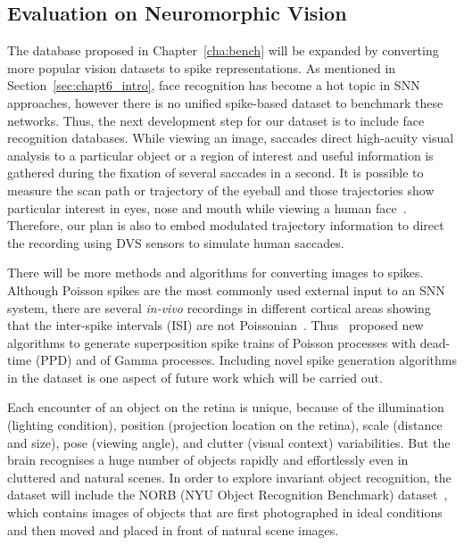 \subsection{Evaluation on Neuromorphic Vision}
The database proposed in Chapter~\ref{cha:bench} will be expanded by converting more popular vision datasets to spike representations.
As mentioned in Section~\ref{sec:chapt6_intro}, face recognition has become a hot topic in SNN approaches, however there is no unified spike-based dataset to benchmark these networks.
Thus, the next development step for our dataset is to include face recognition databases.
While viewing an image, saccades direct high-acuity visual analysis to a particular object or a region of interest and useful information is gathered during the fixation of several saccades in a second.
It is possible to measure the scan path or trajectory of the eyeball and those trajectories show particular interest in eyes, nose and mouth while viewing a human face~\cite{yarbus1967eye}.
Therefore, our plan is also to embed modulated trajectory information to direct the recording using DVS sensors to simulate human saccades.

There will be more methods and algorithms for converting images to spikes.
Although Poisson spikes are the most commonly used external input to an SNN system, there are several \textit{in-vivo} recordings in different cortical areas showing that the inter-spike intervals (ISI) are not Poissonian~\cite{deger2012statistical}. 
Thus~\cite{deger2012statistical} proposed new algorithms to generate superposition spike trains of Poisson processes with dead-time (PPD) and of Gamma processes.
Including novel spike generation algorithms in the dataset is one aspect of future work which will be carried out.

Each encounter of an object on the retina is unique, because of the illumination (lighting condition), position (projection location on the retina), scale (distance and size), pose (viewing angle), and clutter (visual context) variabilities.
But the brain recognises a huge number of objects rapidly and effortlessly even in cluttered and natural scenes.
In order to explore invariant object recognition, the dataset will include the NORB (NYU Object Recognition Benchmark) dataset~\cite{lecun2004learning}, which contains images of objects that are first photographed in ideal conditions and then moved and placed in front of natural scene images.

